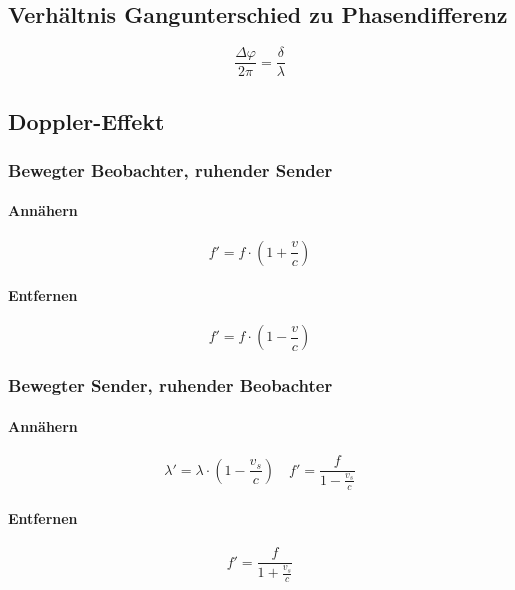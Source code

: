 \subsection{Verhältnis Gangunterschied zu Phasendifferenz}
\begin{equation}\label{eq:gangunterschied:phasendifferenz}
\frac{\Delta\varphi}{2\pi} = \frac{\delta}{\lambda}
\end{equation}

\subsection{Doppler-Effekt}
\subsubsection{Bewegter Beobachter, ruhender Sender}
\paragraph{Annähern}
\begin{equation}\label{eq:doppler:effekt:bewegter:beobachter:annaehern}
f' = f\cdot\left(1 + \frac{v}{c} \right)
\end{equation}

\paragraph{Entfernen}
\begin{equation}\label{eq:doppler:effekt:bewegter:beobachter:entfernen}
f' = f\cdot\left(1 - \frac{v}{c} \right)
\end{equation}

\subsubsection{Bewegter Sender, ruhender Beobachter}
\paragraph{Annähern}
\begin{equation}\label{eq:doppler:effekt:bewegter:sender:annaehern}
\lambda' = \lambda \cdot\left(1 - \frac{v_s}{c} \right) \quad
f' = \frac{f}{1 - \frac{v_s}{c}}
\end{equation}

\paragraph{Entfernen}
\begin{equation}\label{eq:doppler:effekt:bewegter:sender:entfernen}
f' = \frac{f}{1 + \frac{v_s}{c}}
\end{equation}

